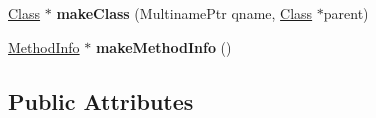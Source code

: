 \begin{DoxyCompactItemize}
\item 
\hypertarget{classjswf_1_1avm2_1_1_a_b_c_file_a2b489657de205228063671ed1ce2dcce}{\hyperlink{classjswf_1_1avm2_1_1_class}{Class} $\ast$ {\bfseries make\+Class} (Multiname\+Ptr qname, \hyperlink{classjswf_1_1avm2_1_1_class}{Class} $\ast$parent)}\label{classjswf_1_1avm2_1_1_a_b_c_file_a2b489657de205228063671ed1ce2dcce}

\item 
\hypertarget{classjswf_1_1avm2_1_1_a_b_c_file_acc7534c98424b4f90cdabbb00ab2e357}{\hyperlink{structjswf_1_1avm2_1_1_method_info}{Method\+Info} $\ast$ {\bfseries make\+Method\+Info} ()}\label{classjswf_1_1avm2_1_1_a_b_c_file_acc7534c98424b4f90cdabbb00ab2e357}

\end{DoxyCompactItemize}
\subsection*{Public Attributes}
